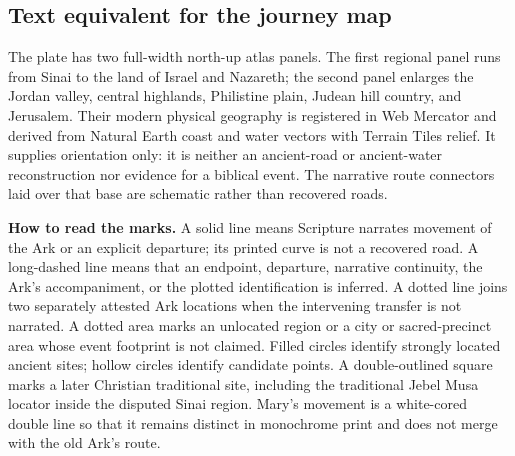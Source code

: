\subsection{Text equivalent for the journey map}

The plate has two full-width north-up atlas panels.  The first regional panel runs
from Sinai to the land of Israel and Nazareth; the second panel enlarges the
Jordan valley, central highlands, Philistine plain, Judean hill country, and
Jerusalem.  Their modern physical geography is registered in Web Mercator and
derived from Natural Earth coast and water vectors with Terrain Tiles relief.
It supplies orientation only: it is neither an ancient-road or ancient-water
reconstruction nor evidence for a biblical event.  The narrative route
connectors laid over that base are schematic rather than recovered roads.

\textbf{How to read the marks.} A solid line means Scripture narrates movement
of the Ark or an explicit departure; its printed curve is not a recovered
road.  A long-dashed line means that an endpoint, departure, narrative
continuity, the Ark's accompaniment, or the plotted identification is
inferred.  A dotted line joins two separately
attested Ark locations when the intervening transfer is not narrated.
A dotted area marks an unlocated region or a city or sacred-precinct area
whose event footprint is not claimed.  Filled circles identify strongly
located ancient sites; hollow circles identify candidate
points.  A double-outlined square marks a later Christian traditional site,
including the traditional Jebel Musa locator inside the disputed Sinai
region.  Mary's movement is a white-cored double line so
that it remains distinct in monochrome print and does not merge with the old
Ark's route.

